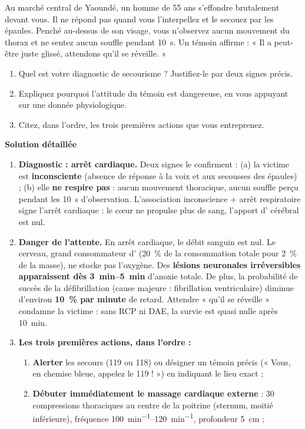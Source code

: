 \documentclass[11pt]{article}
\begin{document}
\begin{exoresolu}
Au marché central de Yaoundé, un homme de 55 ans s'effondre brutalement devant vous. Il ne répond pas quand vous l'interpellez et le secouez par les épaules. Penché au-dessus de son visage, vous n'observez aucun mouvement du thorax et ne sentez aucun souffle pendant \SI{10}{s}. Un témoin affirme : « Il a peut-être juste glissé, attendons qu'il se réveille. »
\begin{enumerate}
\item Quel est votre diagnostic de secourisme ? Justifiez-le par deux signes précis.
\item Expliquez pourquoi l'attitude du témoin est dangereuse, en vous appuyant sur une donnée physiologique.
\item Citez, dans l'ordre, les trois premières actions que vous entreprenez.
\end{enumerate}
\tcblower
\textbf{Solution détaillée}
\begin{enumerate}
\item \textbf{Diagnostic : arrêt cardiaque.} Deux signes le confirment : (a) la victime est \textbf{inconsciente} (absence de réponse à la voix et aux secousses des épaules) ; (b) elle \textbf{ne respire pas} : aucun mouvement thoracique, aucun souffle perçu pendant les \SI{10}{s} d'observation. L'association inconscience + arrêt respiratoire signe l'arrêt cardiaque : le cœur ne propulse plus de sang, l'apport d' cérébral est nul.
\item \textbf{Danger de l'attente.} En arrêt cardiaque, le débit sanguin est nul. Le cerveau, grand consommateur d' (\SI{20}{\%} de la consommation totale pour \SI{2}{\%} de la masse), ne stocke pas l'oxygène. Des \textbf{lésions neuronales irréversibles apparaissent dès \SIrange{3}{5}{min}} d'anoxie totale. De plus, la probabilité de succès de la défibrillation (cause majeure : fibrillation ventriculaire) diminue d'environ \textbf{\SI{10}{\%} par minute} de retard. Attendre « qu'il se réveille » condamne la victime : sans RCP ni DAE, la survie est quasi nulle après \SI{10}{min}.
\item \textbf{Les trois premières actions, dans l'ordre :}
\begin{enumerate}
\item \textbf{Alerter} les secours (119 ou 118) ou désigner un témoin précis (« Vous, en chemise bleue, appelez le 119 ! ») en indiquant le lieu exact ;
\item \textbf{Débuter immédiatement le massage cardiaque externe} : 30 compressions thoraciques au centre de la poitrine (sternum, moitié inférieure), fréquence \SIrange{100}{120}{min^{-1}}, profondeur \SI{5}{cm} ;

\end{enumerate}
\end{enumerate}
\end{exoresolu}
\end{document}
